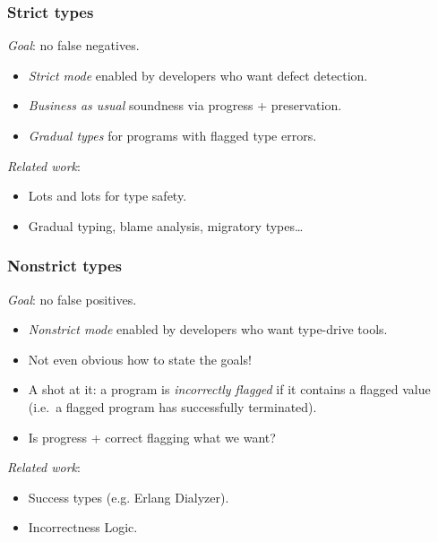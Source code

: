 \documentclass[aspectratio=169]{beamer}
\begin{document}
\begin{frame}

\frametitle{Strict types}

\emph{Goal}: no false negatives.

\begin{itemize}
\item \emph{Strict mode} enabled by developers who want defect detection.
\item \emph{Business as usual} soundness via progress + preservation.
\item \emph{Gradual types} for programs with flagged type errors.
\end{itemize}

\emph{Related work}:
\begin{itemize}
\item Lots and lots for type safety.
\item Gradual typing, blame analysis, migratory types\dots
\end{itemize}

\end{frame}

\begin{frame}

\frametitle{Nonstrict types}

\emph{Goal}: no false positives.

\begin{itemize}
\item \emph{Nonstrict mode} enabled by developers who want type-drive tools.
\item Not even obvious how to state the goals!
\item A shot at it: a program is \emph{incorrectly flagged} if it contains
  a flagged value (i.e.~a flagged program has successfully terminated).
\item Is progress + correct flagging what we want?
\end{itemize}

\emph{Related work}:
\begin{itemize}
\item Success types (e.g. Erlang Dialyzer).
\item Incorrectness Logic.
\end{itemize}

\end{frame}
\end{document}
